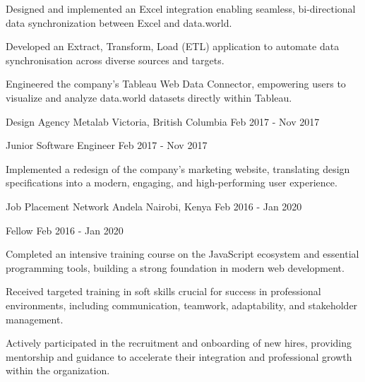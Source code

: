 \begin{cventries}
{\begin{cvsubentries}
{\begin{cvitems}
            \item {Designed and implemented an Excel integration enabling seamless, bi-directional data synchronization between Excel and data.world.}
            \item {Developed an Extract, Transform, Load (ETL) application to automate data synchronisation across diverse sources and targets.}
            \item {Engineered the company's Tableau Web Data Connector, empowering users to visualize and analyze data.world datasets directly within Tableau.}
          \end{cvitems}
         }
      \end{cvsubentries}
    }

  \cventry
    {Design Agency} %
    {Metalab} %
    {Victoria, British Columbia} %
    {Feb 2017 - Nov 2017} %
    {
      \begin{cvsubentries}
       \cvsubentry
         {Junior Software Engineer}
         {Feb 2017 - Nov 2017}
         {
          \begin{cvitems} %
            \item {Implemented a redesign of the company’s marketing website, translating design specifications into a modern, engaging, and high-performing user experience.}
          \end{cvitems}
         }
      \end{cvsubentries}
    }

  \cventry
    {Job Placement Network} %
    {Andela} %
    {Nairobi, Kenya} %
    {Feb 2016 - Jan 2020} %
    {
      \begin{cvsubentries}
       \cvsubentry
          {Fellow}
          {Feb 2016 - Jan 2020}
          {
            \begin{cvitems} %
              \item {Completed an intensive training course on the JavaScript ecosystem and essential programming tools, building a strong foundation in modern web development.}
              \item {Received targeted training in soft skills crucial for success in professional environments, including communication, teamwork, adaptability, and stakeholder management.}
              \item {Actively participated in the recruitment and onboarding of new hires, providing mentorship and guidance to accelerate their integration and professional growth within the organization.}
            \end{cvitems}
          }
      \end{cvsubentries}
    }


\end{cventries}
